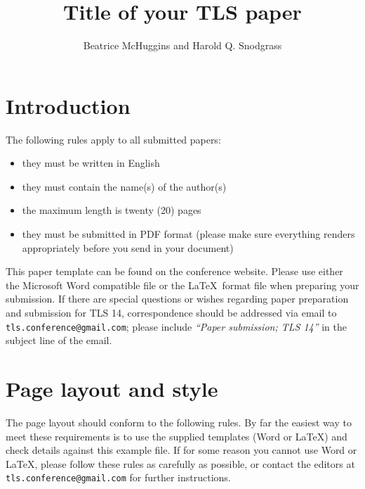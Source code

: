 \documentclass[11pt]{article}
\title{Title of your TLS paper}
\author{Beatrice McHuggins and Harold Q. Snodgrass}
\begin{document}
\maketitle

\section{Introduction}

The following rules apply to all submitted papers:

\begin{itemize}
\item they must be written in English
\item they must contain the name(s) of the author(s)
\item the maximum length is twenty (20) pages 
\item they must be submitted in PDF format (please make sure everything renders
appropriately before you send in your document)
\end{itemize}

This paper template can be found on the conference website. Please use either
the Microsoft Word compatible file or the \LaTeX\ format file when preparing
your submission. If there are special questions or wishes regarding paper
preparation and submission for TLS 14, correspondence should be addressed via
email to {\tt tls.conference@gmail.com}; please include {\em ``Paper submission; TLS 14''} 
in the subject line of the email.




\section{Page layout and style}

The page layout should conform to the following rules. By far the easiest way
to meet these requirements is to use the supplied templates (Word or \LaTeX)
and check details against this example file. If for some reason you cannot use
Word or \LaTeX, please follow these rules as carefully as possible, or contact
the editors at {\tt tls.conference@gmail.com} for further instructions.
\end{document}
